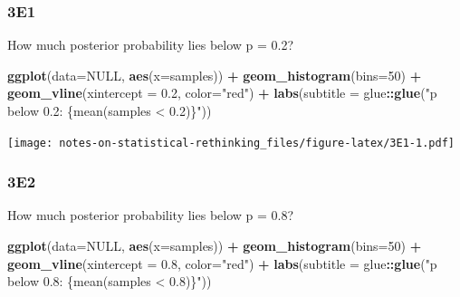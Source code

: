 \documentclass[
]{book}
\newenvironment{Shaded}{\begin{snugshade}}{\end{snugshade}}
\newcommand{\DataTypeTok}[1]{\textcolor[rgb]{0.13,0.29,0.53}{#1}}
\newcommand{\DecValTok}[1]{\textcolor[rgb]{0.00,0.00,0.81}{#1}}
\newcommand{\FloatTok}[1]{\textcolor[rgb]{0.00,0.00,0.81}{#1}}
\newcommand{\KeywordTok}[1]{\textcolor[rgb]{0.13,0.29,0.53}{\textbf{#1}}}
\newcommand{\NormalTok}[1]{#1}
\newcommand{\OperatorTok}[1]{\textcolor[rgb]{0.81,0.36,0.00}{\textbf{#1}}}
\newcommand{\OtherTok}[1]{\textcolor[rgb]{0.56,0.35,0.01}{#1}}
\newcommand{\StringTok}[1]{\textcolor[rgb]{0.31,0.60,0.02}{#1}}
\begin{document}
\hypertarget{e1-1}{%
\subsubsection*{3E1}\label{e1-1}}

How much posterior probability lies below p = 0.2?

\begin{Shaded}
\begin{Highlighting}[]
\KeywordTok{ggplot}\NormalTok{(}\DataTypeTok{data=}\OtherTok{NULL}\NormalTok{, }\KeywordTok{aes}\NormalTok{(}\DataTypeTok{x=}\NormalTok{samples)) }\OperatorTok{+}\StringTok{ }
\StringTok{  }\KeywordTok{geom\_histogram}\NormalTok{(}\DataTypeTok{bins=}\DecValTok{50}\NormalTok{) }\OperatorTok{+}\StringTok{ }
\StringTok{  }\KeywordTok{geom\_vline}\NormalTok{(}\DataTypeTok{xintercept =} \FloatTok{0.2}\NormalTok{, }\DataTypeTok{color=}\StringTok{"red"}\NormalTok{) }\OperatorTok{+}\StringTok{ }
\StringTok{  }\KeywordTok{labs}\NormalTok{(}\DataTypeTok{subtitle =}\NormalTok{ glue}\OperatorTok{::}\KeywordTok{glue}\NormalTok{(}\StringTok{"p below 0.2: \{mean(samples \textless{} 0.2)\}"}\NormalTok{))}
\end{Highlighting}
\end{Shaded}

\texttt{[image: notes-on-statistical-rethinking\_files/figure-latex/3E1-1.pdf]}

\hypertarget{e2-1}{%
\subsubsection*{3E2}\label{e2-1}}

How much posterior probability lies below p = 0.8?

\begin{Shaded}
\begin{Highlighting}[]
\KeywordTok{ggplot}\NormalTok{(}\DataTypeTok{data=}\OtherTok{NULL}\NormalTok{, }\KeywordTok{aes}\NormalTok{(}\DataTypeTok{x=}\NormalTok{samples)) }\OperatorTok{+}\StringTok{ }
\StringTok{  }\KeywordTok{geom\_histogram}\NormalTok{(}\DataTypeTok{bins=}\DecValTok{50}\NormalTok{) }\OperatorTok{+}\StringTok{ }
\StringTok{  }\KeywordTok{geom\_vline}\NormalTok{(}\DataTypeTok{xintercept =} \FloatTok{0.8}\NormalTok{, }\DataTypeTok{color=}\StringTok{"red"}\NormalTok{) }\OperatorTok{+}\StringTok{ }
\StringTok{  }\KeywordTok{labs}\NormalTok{(}\DataTypeTok{subtitle =}\NormalTok{ glue}\OperatorTok{::}\KeywordTok{glue}\NormalTok{(}\StringTok{"p below 0.8: \{mean(samples \textless{} 0.8)\}"}\NormalTok{))}
\end{Highlighting}
\end{Shaded}
\end{document}
